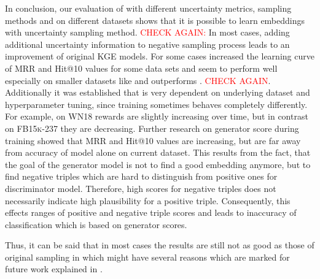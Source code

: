 In conclusion, our evaluation of \ucgan with different uncertainty metrics, sampling methods and on different datasets shows that it is possible to learn embeddings with uncertainty sampling method.
\textcolor{red}{CHECK AGAIN:} In most cases, adding additional uncertainty information to negative sampling process leads to an improvement of original \ac{KGE} models.
For some cases \ucgan increased the learning curve of MRR and Hit@10 values for some data sets and seem to perform well especially on smaller datasets like \umls and outperforms \kbgan. \textcolor{red}{CHECK AGAIN}.
Additionally it was established that \ucgan is very dependent on underlying dataset and hyperparameter tuning, since training sometimes behaves completely differently.
For example, on \textsc{WN18} rewards are slightly increasing over time, but in contrast on \textsc{FB15k-237} they are decreasing.
Further research on generator score during training showed that MRR and Hit@10 values are increasing, but are far away from accuracy of model alone on current dataset.
This results from the fact, that the goal of the generator model is not to find a good embedding anymore, but to find negative triples which are hard to distinguish from positive ones for discriminator model.
Therefore, high scores for negative triples does not necessarily indicate high plausibility for a positive triple.
Consequently, this effects ranges of positive and negative triple scores and leads to inaccuracy of classification which is based on generator scores.

Thus, it can be said that in most cases the results are still not as good as those of original sampling in \kbgan which might have several reasons which are marked for future work explained in .






